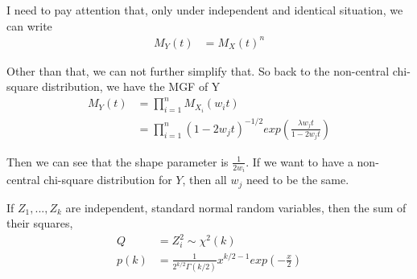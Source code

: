 I need to pay attention that, only under independent and identical situation, we can write
 \begin{align*}
 	M_Y(t) &= M_{X}(t)^n
 \end{align*}

Other than that, we can not further simplify that. So back to the non-central chi-square distribution, we have the MGF of Y
\begin{align*}
	M_Y(t) &= \prod_{i=1}^n M_{X_i}(w_i t)\\
	&=\prod_{i=1}^n  (1-2 w_jt)^{-1/2} exp \left( \frac{ \lambda w_j t }{1-2 w_j t} \right)
\end{align*}

Then we can see that the shape parameter is $\frac{1}{2 w_i}$. If we want to have a non-central chi-square distribution for $Y$, then all $w_j$ need to be the same. 

 If $Z_1, ..., Z_k$ are independent, standard normal random variables, then the sum of their squares,
\begin{align*}
	Q &= Z_i^2 \sim \chi^2(k)\\
    p(k) &= \frac{1}{2^{k/2} \Gamma(k/2)} x^{k/2-1} exp(-\frac{x}{2})
\end{align*}

